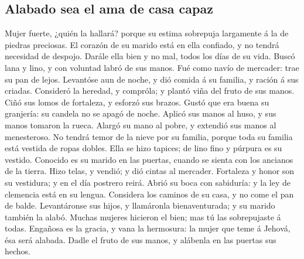 \hypertarget{alabado-sea-el-ama-de-casa-capaz}{%
\subsection{Alabado sea el ama de casa
capaz}\label{alabado-sea-el-ama-de-casa-capaz}}

 Mujer fuerte, ¿quién la hallará? porque su estima
sobrepuja largamente á la de piedras preciosas.  El
corazón de su marido está en ella confiado, y no tendrá necesidad de
despojo.  Darále ella bien y no mal, todos los días de su
vida.  Buscó lana y lino, y con voluntad labró de sus
manos.  Fué como navío de mercader: trae su pan de lejos.
 Levantóse aun de noche, y dió comida á su familia, y
ración á sus criadas.  Consideró la heredad, y compróla;
y plantó viña del fruto de sus manos.  Ciñó sus lomos de
fortaleza, y esforzó sus brazos.  Gustó que era buena su
granjería: su candela no se apagó de noche.  Aplicó sus
manos al huso, y sus manos tomaron la rueca.  Alargó su
mano al pobre, y extendió sus manos al menesteroso.  No
tendrá temor de la nieve por su familia, porque toda su familia está
vestida de ropas dobles.  Ella se hizo tapices; de lino
fino y púrpura es su vestido.  Conocido es su marido en
las puertas, cuando se sienta con los ancianos de la tierra.
 Hizo telas, y vendió; y dió cintas al mercader.
 Fortaleza y honor son su vestidura; y en el día postrero
reirá.  Abrió su boca con sabiduría: y la ley de
clemencia está en su lengua.  Considera los caminos de su
casa, y no come el pan de balde.  Levantáronse sus hijos,
y llamáronla bienaventurada; y su marido también la alabó.
 Muchas mujeres hicieron el bien; mas tú las sobrepujaste
á todas.  Engañosa es la gracia, y vana la hermosura: la
mujer que teme á Jehová, ésa será alabada.  Dadle el
fruto de sus manos, y alábenla en las puertas sus hechos.
